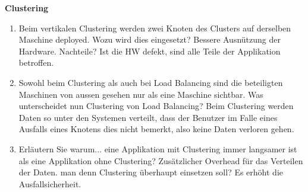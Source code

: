\documentclass[a4paper,10pt]{scrreprt}
\begin{document}
\textbf{Clustering}
\begin{enumerate}

\item  Beim vertikalen Clustering werden zwei Knoten des Clusters auf derselben Maschine deployed.
\subitem  Wozu wird dies eingesetzt? Bessere Ausnützung der Hardware.
\subitem Nachteile? Ist die HW defekt, sind alle Teile der Applikation betroffen. 
\item  Sowohl beim Clustering als auch bei Load Balancing sind die beteiligten Maschinen von aussen gesehen nur als eine
Maschine sichtbar. Was unterscheidet nun Clustering von Load Balancing?
Beim Clustering werden Daten so unter den Systemen verteilt, dass der Benutzer im Falle eines Ausfalls eines Knotens
dies nicht bemerkt, also keine Daten verloren gehen.
\item Erläutern Sie warum...
\subitem  eine Applikation mit Clustering immer langsamer ist als eine Applikation ohne Clustering?
Zusätzlicher Overhead für das Verteilen der Daten.
\subitem man denn Clustering überhaupt einsetzen soll? Es erhöht die Ausfallsicherheit.
\end{enumerate}
\end{document}
